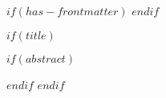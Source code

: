 $if(has-frontmatter)$
  \frontmatter
$endif$

$if(title)$
  \maketitle
  \vspace*{-4em}
  $if(abstract)$
    \begin{abstract}
      $abstract$
    \end{abstract}
  $endif$
$endif$

\vspace{2em}